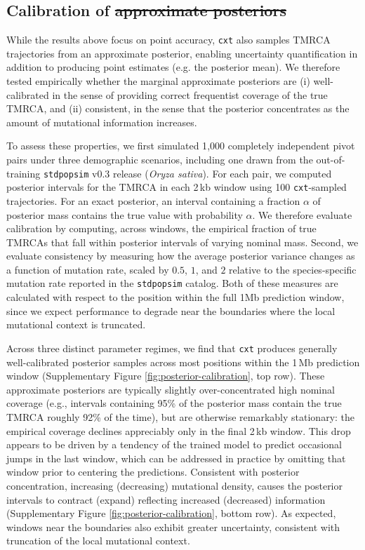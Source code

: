 \documentclass[9pt,twoside]{pnas-new} %
\makeatletter
\newcommand{\cxtkit}{\texttt{cxt}\xspace}
\newcommand{\stdpopsim}{\texttt{stdpopsim}\xspace}
\providecommand{\DIFadd}[1]{{\protect\color{blue}\uwave{#1}}} %
\providecommand{\DIFdel}[1]{{\protect\color{red}\sout{#1}}} %
\providecommand{\DIFaddbegin}{} %
\providecommand{\DIFaddend}{} %
\providecommand{\DIFdelbegin}{} %
\providecommand{\DIFdelend}{} %
\let\sout@orig\sout %
\renewcommand{\sout}[1]{\ifmmode\text{\sout@orig{\ensuremath{#1}}}\else\sout@orig{#1}\fi} %
\makeatother
\begin{document}
\subsection*{Calibration of \DIFdelbegin \DIFdel{approximate posteriors}\DIFdelend \DIFaddbegin \DIFadd{Approximate Posteriors}\DIFaddend }
\label{sec:calibration}

While the results above focus on point accuracy, \cxtkit also samples TMRCA trajectories from an approximate posterior, 
enabling uncertainty quantification in addition to producing point estimates (e.g. the posterior mean). 
We therefore tested empirically
whether the marginal approximate posteriors are (i) well-calibrated in the sense of providing correct frequentist
coverage of the true TMRCA, 
and (ii) consistent, in the sense that the posterior concentrates as the amount of mutational information increases.

To assess these properties, we first simulated 1{,}000 completely independent pivot pairs under three demographic scenarios, 
including one drawn from the out-of-training \stdpopsim v0.3 release (\emph{Oryza sativa}).
For each pair, we computed posterior intervals for the TMRCA in each 2\,kb window using
100 \cxtkit-sampled trajectories. 
For an exact posterior, an interval containing a fraction $\alpha$ of posterior mass contains the true value with probability $\alpha$. We therefore evaluate calibration by computing, across windows, the empirical fraction of true TMRCAs
that fall within posterior intervals of varying nominal mass. 
Second, we evaluate consistency by measuring how the average posterior variance changes as a function of mutation rate,
scaled by $0.5$, $1$, and $2$ relative to the species-specific mutation rate reported in the \stdpopsim catalog. 
Both of these measures are calculated with respect to the position within the full 1Mb prediction window,
since we expect performance to degrade near the
boundaries where the local mutational context is truncated.

Across three distinct parameter regimes, 
we find that \cxtkit produces generally well-calibrated posterior samples across
most positions within the 1\,Mb prediction window (Supplementary Figure \ref{fig:posterior-calibration}, top row). 
These approximate posteriors are typically slightly
over-concentrated \DIFaddbegin \DIFadd{at }\DIFaddend high nominal coverage (e.g., intervals containing 95\% of the posterior mass contain the true
TMRCA roughly 92\% of the time), 
but are otherwise remarkably stationary: the empirical coverage declines appreciably only in the final 2\,kb window. 
This drop appears to be driven by a tendency of the trained model to predict occasional jumps in the last window,
which can be addressed in practice by omitting that window prior to centering the predictions. 
Consistent with posterior concentration,
increasing (decreasing) mutational density, causes the posterior intervals to contract (expand)
reflecting increased (decreased) information (Supplementary Figure \ref{fig:posterior-calibration}, bottom row). 
As expected, windows near the boundaries also exhibit greater uncertainty, consistent with truncation of the local mutational context.
\end{document}
